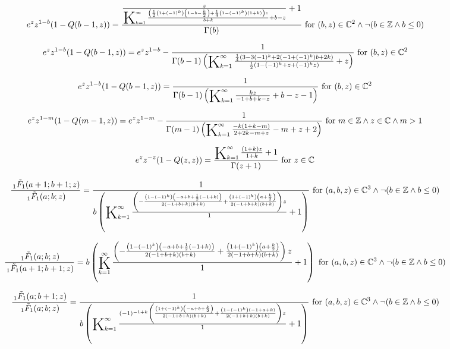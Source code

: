 \documentclass{article}
\newcommand{\bigK}{\mathop{\raisebox{-5pt}{\huge K}}}
\begin{document}
\[e^z z^{1-b} (1-Q(b-1,z))=\frac{\frac{z}{\bigK_{k=1}^{\infty}\frac{\left(\frac{1}{2} \left(1+(-1)^k\right) \left(1-b-\frac{k}{2}\right)+\frac{1}{4} \left(1-(-1)^k\right) (1+k)\right) z}{b+k}+b-z}+1}{\Gamma (b)}\text{ for }(b,z)\in \mathbb{C}^2\land \neg (b\in \mathbb{Z}\land b\leq 0)\] 

\[e^z z^{1-b} (1-Q(b-1,z))=e^z z^{1-b}-\frac{1}{\Gamma (b-1) \left(\bigK_{k=1}^{\infty}\frac{\frac{1}{4} \left(3-3 (-1)^k+2 \left(-1+(-1)^k\right) b+2 k\right)}{\frac{1}{2} \left(1-(-1)^k+z+(-1)^k z\right)}+z\right)}\text{ for }(b,z)\in \mathbb{C}^2\] 

\[e^z z^{1-b} (1-Q(b-1,z))=\frac{1}{\Gamma (b-1) \left(\bigK_{k=1}^{\infty}\frac{k z}{-1+b+k-z}+b-z-1\right)}\text{ for }(b,z)\in \mathbb{C}^2\] 

\[e^z z^{1-m} (1-Q(m-1,z))=e^z z^{1-m}-\frac{1}{\Gamma (m-1) \left(\bigK_{k=1}^{\infty}\frac{-k (1+k-m)}{2+2 k-m+z}-m+z+2\right)}\text{ for }m\in \mathbb{Z}\land z\in \mathbb{C}\land m>1\] 

\[e^z z^{-z} (1-Q(z,z))=\frac{\bigK_{k=1}^{\infty}\frac{(1+k) z}{1+k}+1}{\Gamma (z+1)}\text{ for }z\in \mathbb{C}\] 

\[\frac{\, _1\tilde{F}_1(a+1;b+1;z)}{\, _1\tilde{F}_1(a;b;z)}=\frac{1}{b \left(\bigK_{k=1}^{\infty}\frac{\left(-\frac{\left(1-(-1)^k\right) \left(-a+b+\frac{1}{2} (-1+k)\right)}{2 (-1+b+k) (b+k)}+\frac{\left(1+(-1)^k\right) \left(a+\frac{k}{2}\right)}{2 (-1+b+k) (b+k)}\right) z}{1}+1\right)}\text{ for }(a,b,z)\in \mathbb{C}^3\land \neg (b\in \mathbb{Z}\land b\leq 0)\] 

\[\frac{\, _1\tilde{F}_1(a;b;z)}{\, _1\tilde{F}_1(a+1;b+1;z)}=b \left(\bigK_{k=1}^{\infty}\frac{\left(-\frac{\left(1-(-1)^k\right) \left(-a+b+\frac{1}{2} (-1+k)\right)}{2 (-1+b+k) (b+k)}+\frac{\left(1+(-1)^k\right) \left(a+\frac{k}{2}\right)}{2 (-1+b+k) (b+k)}\right) z}{1}+1\right)\text{ for }(a,b,z)\in \mathbb{C}^3\land \neg (b\in \mathbb{Z}\land b\leq 0)\] 

\[\frac{\, _1\tilde{F}_1(a;b+1;z)}{\, _1\tilde{F}_1(a;b;z)}=\frac{1}{b \left(\bigK_{k=1}^{\infty}\frac{(-1)^{-1+k} \left(\frac{\left(1+(-1)^k\right) \left(-a+b+\frac{k}{2}\right)}{2 (-1+b+k) (b+k)}+\frac{\left(1-(-1)^k\right) (-1+a+k)}{2 (-1+b+k) (b+k)}\right) z}{1}+1\right)}\text{ for }(a,b,z)\in \mathbb{C}^3\land \neg (b\in \mathbb{Z}\land b\leq 0)\] 
\end{document}
